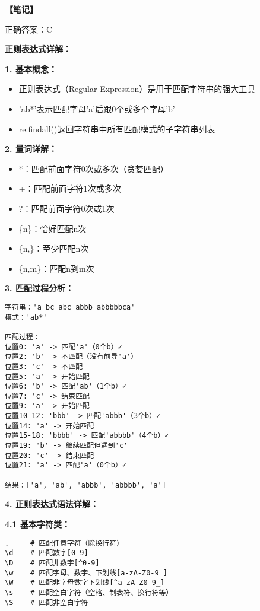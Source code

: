\begin{mdframed}[linewidth=1pt, linecolor=black]

  \textbf{\color{red}【笔记】}

  正确答案：C

  \textbf{正则表达式详解：}

  \textbf{1. 基本概念：}
  \begin{itemize}
    \item 正则表达式（Regular Expression）是用于匹配字符串的强大工具
    \item 'ab*'表示匹配字母'a'后跟0个或多个字母'b'
    \item re.findall()返回字符串中所有匹配模式的子字符串列表
  \end{itemize}

  \textbf{2. 量词详解：}
  \begin{itemize}
    \item *：匹配前面字符0次或多次（贪婪匹配）
    \item +：匹配前面字符1次或多次
    \item ?：匹配前面字符0次或1次
    \item \{n\}：恰好匹配n次
    \item \{n,\}：至少匹配n次
    \item \{n,m\}：匹配n到m次
  \end{itemize}

  \textbf{3. 匹配过程分析：}
  \begin{lstlisting}
字符串：'a bc abc abbb abbbbbca'
模式：'ab*'

匹配过程：
位置0: 'a' -> 匹配'a'（0个b）✓
位置2: 'b' -> 不匹配（没有前导'a'）
位置3: 'c' -> 不匹配
位置5: 'a' -> 开始匹配
位置6: 'b' -> 匹配'ab'（1个b）✓
位置7: 'c' -> 结束匹配
位置9: 'a' -> 开始匹配
位置10-12: 'bbb' -> 匹配'abbb'（3个b）✓
位置14: 'a' -> 开始匹配
位置15-18: 'bbbb' -> 匹配'abbbb'（4个b）✓
位置19: 'b' -> 继续匹配但遇到'c'
位置20: 'c' -> 结束匹配
位置21: 'a' -> 匹配'a'（0个b）✓

结果：['a', 'ab', 'abbb', 'abbbb', 'a']
  \end{lstlisting}

  \textbf{4. 正则表达式语法详解：}

  \textbf{4.1 基本字符类：}
  \begin{lstlisting}
.     # 匹配任意字符（除换行符）
\d    # 匹配数字[0-9]
\D    # 匹配非数字[^0-9]
\w    # 匹配字母、数字、下划线[a-zA-Z0-9_]
\W    # 匹配非字母数字下划线[^a-zA-Z0-9_]
\s    # 匹配空白字符（空格、制表符、换行符等）
\S    # 匹配非空白字符
  \end{lstlisting}


\end{mdframed}
